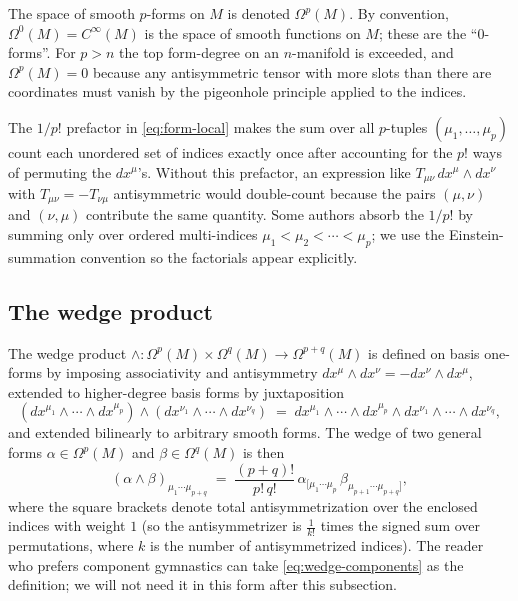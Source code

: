 \medskip

\noindent The space of smooth $p$-forms on $M$ is denoted $\Omega^p(M)$. By convention, $\Omega^0(M) = C^\infty(M)$ is the space of smooth functions on $M$; these are the ``$0$-forms''. For $p > n$ the top form-degree on an $n$-manifold is exceeded, and $\Omega^p(M) = 0$ because any antisymmetric tensor with more slots than there are coordinates must vanish by the pigeonhole principle applied to the indices.

\begin{remark}\label{rem:pfactorial}
The $1/p!$ prefactor in \eqref{eq:form-local} makes the sum over all $p$-tuples $(\mu_1,\ldots,\mu_p)$ count each unordered set of indices exactly once after accounting for the $p!$ ways of permuting the $dx^\mu$'s. Without this prefactor, an expression like $T_{\mu\nu}\,dx^\mu\wedge dx^\nu$ with $T_{\mu\nu} = -T_{\nu\mu}$ antisymmetric would double-count because the pairs $(\mu,\nu)$ and $(\nu,\mu)$ contribute the same quantity. Some authors absorb the $1/p!$ by summing only over ordered multi-indices $\mu_1 < \mu_2 < \cdots < \mu_p$; we use the Einstein-summation convention so the factorials appear explicitly.
\end{remark}

\subsection{The wedge product}

The wedge product $\wedge : \Omega^p(M) \times \Omega^q(M) \to \Omega^{p+q}(M)$ is defined on basis one-forms by imposing associativity and antisymmetry $dx^\mu \wedge dx^\nu = -dx^\nu \wedge dx^\mu$, extended to higher-degree basis forms by juxtaposition
\begin{equation*}
(dx^{\mu_1}\wedge\cdots\wedge dx^{\mu_p}) \wedge (dx^{\nu_1}\wedge\cdots\wedge dx^{\nu_q}) \;=\; dx^{\mu_1}\wedge\cdots\wedge dx^{\mu_p}\wedge dx^{\nu_1}\wedge\cdots\wedge dx^{\nu_q},
\end{equation*}
and extended bilinearly to arbitrary smooth forms. The wedge of two general forms $\alpha \in \Omega^p(M)$ and $\beta \in \Omega^q(M)$ is then
\begin{equation}\label{eq:wedge-components}
(\alpha \wedge \beta)_{\mu_1\cdots\mu_{p+q}} \;=\; \frac{(p+q)!}{p!\,q!}\,\alpha_{[\mu_1\cdots\mu_p}\,\beta_{\mu_{p+1}\cdots\mu_{p+q}]},
\end{equation}
where the square brackets denote total antisymmetrization over the enclosed indices with weight $1$ (so the antisymmetrizer is $\tfrac{1}{k!}$ times the signed sum over permutations, where $k$ is the number of antisymmetrized indices). The reader who prefers component gymnastics can take \eqref{eq:wedge-components} as the definition; we will not need it in this form after this subsection.

